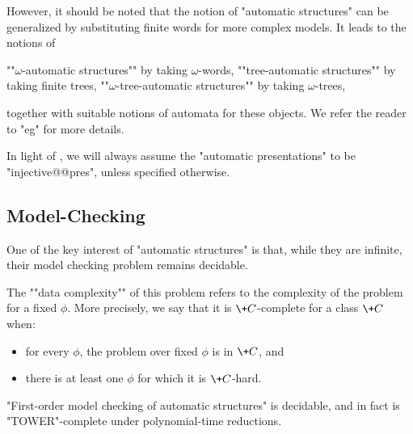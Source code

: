However, it should be noted that the notion of "automatic structures" can be generalized
by substituting finite words for more complex models. It leads to the notions of
\begin{itemize}
	\itemAP ""$\omega$-automatic structures"" by taking $\omega$-words,
	\itemAP ""tree-automatic structures"" by taking finite trees,
	\itemAP ""$\omega$-tree-automatic structures"" by taking $\omega$-trees,
\end{itemize}
together with suitable notions of automata for these objects.
We refer the reader to "eg" \cite[\S~XII]{Blumensath2024MSOModelTheory} for more details.

\begin{hypothesis}
	In light of ,
	we will always assume the "automatic presentations"
	to be "injective@@pres", unless specified otherwise.
\end{hypothesis}

\subsection{Model-Checking}

One of the key interest of "automatic structures" is that, while they are infinite,
their model checking problem remains decidable.


The \AP""data complexity"" of this problem refers to the complexity
of the problem for a fixed $\phi$. More precisely,
we say that it is $\+C$-complete for a class $\+C$ when:
\begin{itemize}
	\item for every $\phi$, the problem over fixed $\phi$ is in $\+C$, and
	\item there is at least one $\phi$ for which it is $\+C$-hard.
\end{itemize}

\begin{proposition}
	\!
	\AP\label{prop:first-order-model-checking-automatic-structures}
	"First-order model checking of automatic structures" is decidable,
	and in fact is "TOWER"-complete under polynomial-time reductions.
\end{proposition}

